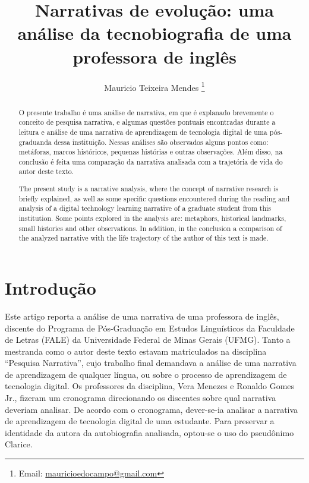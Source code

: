 \documentclass{textolivre-html}
\title{Narrativas de evolução: uma análise da tecnobiografia de uma professora de inglês}
\author[1]{Mauricio Teixeira Mendes \orcid{0000-0001-9619-5903} \thanks{Email: \url{mauricioedocampo@gmail.com}}}
\affil[1]{Universidade Federal de Minas Gerais, Brasil.}
\begin{document}
\maketitle

\begin{polyabstract}
\begin{portuguese}
\begin{abstract}
O presente trabalho é uma análise de narrativa, em que é explanado brevemente o conceito de pesquisa narrativa, e algumas questões pontuais encontradas durante a leitura e análise de uma narrativa de aprendizagem de tecnologia digital de uma pós-graduanda dessa instituição. Nessas análises são observados alguns pontos como: metáforas, marcos históricos, pequenas histórias e outras observações. Além disso, na conclusão é feita uma comparação da narrativa analisada com a trajetória de vida do autor deste texto.

\end{abstract}
\end{portuguese}

\begin{english}
\begin{abstract}
The present study is a narrative analysis, where the concept of narrative research is briefly explained, as well as some specific questions encountered during the reading and analysis of a digital technology learning narrative of a graduate student from this institution. Some points explored in the analysis are: metaphors, historical landmarks, small histories and other observations. In addition, in the conclusion a comparison of the analyzed narrative with the life trajectory of the author of this text is made.

\end{abstract}
\end{english}

\end{polyabstract}


\section{Introdução}\label{sec-intro}
Este artigo reporta a análise de uma narrativa de uma professora de inglês, discente do Programa de Pós-Graduação em Estudos Linguísticos da Faculdade de Letras (FALE) da Universidade Federal de Minas Gerais (UFMG). Tanto a mestranda como o autor deste texto estavam matriculados na disciplina “Pesquisa Narrativa”, cujo trabalho final demandava a análise de uma narrativa de aprendizagem de qualquer língua, ou sobre o processo de aprendizagem de tecnologia digital. Os professores da disciplina, Vera Menezes e Ronaldo Gomes Jr., fizeram um cronograma direcionando os discentes sobre qual narrativa deveriam analisar. De acordo com o cronograma, dever-se-ia analisar a narrativa de aprendizagem de tecnologia digital de uma estudante. Para preservar a identidade da autora da autobiografia analisada, optou-se o uso do pseudônimo Clarice.
\end{document}
